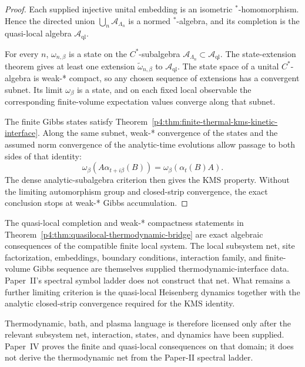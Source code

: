 \documentclass[12pt,a4paper]{article}
\begin{document}
\begin{proof}
Each supplied injective unital embedding is an isometric
\(^*\)-homomorphism.  Hence the directed union
\(\bigcup_n\mathcal A_{\Lambda_n}\) is a normed \(^*\)-algebra, and its
completion is the quasi-local algebra \(\mathcal A_{\mathrm{ql}}\).

For every \(n\), \(\omega_{n,\beta}\) is a state on the
\(C^*\)-subalgebra
\(\mathcal A_{\Lambda_n}\subset\mathcal A_{\mathrm{ql}}\).
The state-extension theorem gives at least one extension
\(\widetilde\omega_{n,\beta}\) to
\(\mathcal A_{\mathrm{ql}}\).  The state space of a unital
\(C^*\)-algebra is weak-* compact, so any chosen sequence of extensions has
a convergent subnet.  Its limit \(\omega_\beta\) is a state, and on each
fixed local observable the corresponding finite-volume expectation values
converge along that subnet.

The finite Gibbs states satisfy
Theorem~\ref{p4:thm:finite-thermal-kms-kinetic-interface}.  Along the same
subnet, weak-* convergence of the states and the assumed norm convergence
of the analytic-time evolutions allow passage to both sides of that
identity:
\[
\omega_\beta\!\left(A\alpha_{t+i\beta}(B)\right)
=
\omega_\beta\!\left(\alpha_t(B)A\right).
\]
The dense analytic-subalgebra criterion then gives the KMS property.
Without the limiting automorphism group and closed-strip convergence, the
exact conclusion stops at weak-* Gibbs accumulation.
\end{proof}

\begin{remark}
\label{p4:rem:thermo-conditionality}
The quasi-local completion and weak-* compactness statements in Theorem~\ref{p4:thm:quasilocal-thermodynamic-bridge} are exact algebraic consequences of the compatible finite local system.
The local subsystem net, site factorization, embeddings, boundary
conditions, interaction family, and finite-volume Gibbs sequence are
themselves supplied thermodynamic-interface data.  Paper~II's spectral
symbol ladder does not construct that net.  What remains a further limiting
criterion is the quasi-local Heisenberg dynamics together with the analytic
closed-strip convergence required for the KMS identity.
\end{remark}

Thermodynamic, bath, and plasma language is therefore licensed only after
the relevant subsystem net, interaction, states, and dynamics have been
supplied.  Paper~IV proves the finite and quasi-local consequences on that
domain; it does not derive the thermodynamic net from the Paper-II spectral
ladder.
\end{document}
